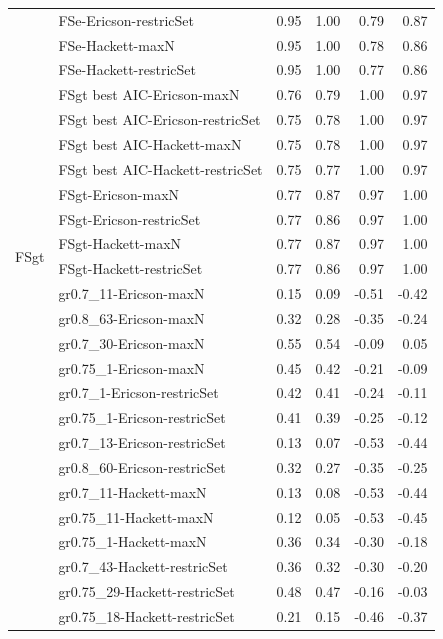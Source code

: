 {\begin{landscape}
\begin{footnotesize}
\begin{longtable}{@{}ll|rrrr@{}}
 & FSe-Ericson-restricSet & 0.95 & 1.00 & 0.79 & 0.87 \\
 & FSe-Hackett-maxN & 0.95 & 1.00 & 0.78 & 0.86 \\
 & FSe-Hackett-restricSet & 0.95 & 1.00 & 0.77 & 0.86 \\
\addlinespace
\multirow{6}{*}{FSgt} & FSgt best AIC-Ericson-maxN & 0.76 & 0.79 & 1.00 & 0.97 \\
 & FSgt best AIC-Ericson-restricSet & 0.75 & 0.78 & 1.00 & 0.97 \\
 & FSgt best AIC-Hackett-maxN & 0.75 & 0.78 & 1.00 & 0.97 \\
 & FSgt best AIC-Hackett-restricSet & 0.75 & 0.77 & 1.00 & 0.97 \\
 & FSgt-Ericson-maxN & 0.77 & 0.87 & 0.97 & 1.00 \\
 & FSgt-Ericson-restricSet & 0.77 & 0.86 & 0.97 & 1.00 \\
\multirow{2}{*}{FSgt} & FSgt-Hackett-maxN & 0.77 & 0.87 & 0.97 & 1.00 \\
 & FSgt-Hackett-restricSet & 0.77 & 0.86 & 0.97 & 1.00 \\
\addlinespace
\multirow{14}{*}{Iteroparity} & gr0.7\_11-Ericson-maxN & 0.15 & 0.09 & -0.51 & -0.42 \\
 & gr0.8\_63-Ericson-maxN & 0.32 & 0.28 & -0.35 & -0.24 \\
 & gr0.7\_30-Ericson-maxN & 0.55 & 0.54 & -0.09 & 0.05 \\
 & gr0.75\_1-Ericson-maxN & 0.45 & 0.42 & -0.21 & -0.09 \\
 & gr0.7\_1-Ericson-restricSet & 0.42 & 0.41 & -0.24 & -0.11 \\
 & gr0.75\_1-Ericson-restricSet & 0.41 & 0.39 & -0.25 & -0.12 \\
 & gr0.7\_13-Ericson-restricSet & 0.13 & 0.07 & -0.53 & -0.44 \\
 & gr0.8\_60-Ericson-restricSet & 0.32 & 0.27 & -0.35 & -0.25 \\
 & gr0.7\_11-Hackett-maxN & 0.13 & 0.08 & -0.53 & -0.44 \\
 & gr0.75\_11-Hackett-maxN & 0.12 & 0.05 & -0.53 & -0.45 \\
 & gr0.75\_1-Hackett-maxN & 0.36 & 0.34 & -0.30 & -0.18 \\
 & gr0.7\_43-Hackett-restricSet & 0.36 & 0.32 & -0.30 & -0.20 \\
 & gr0.75\_29-Hackett-restricSet & 0.48 & 0.47 & -0.16 & -0.03 \\
 & gr0.75\_18-Hackett-restricSet & 0.21 & 0.15 & -0.46 & -0.37 \\

\end{longtable}
\end{footnotesize}
\end{landscape}}
